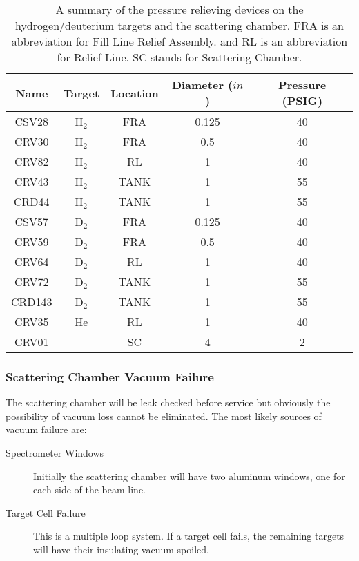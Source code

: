 {\begin{table}[htb]
\begin{center}
\begin{tabular}{|c|c|c|c|c|} \hline
Name & Target & Location & Diameter ($in$) & Pressure (PSIG) \\ \hline
CSV28 & H$_2$ & FRA & 0.125 & 40 \\ \hline
CRV30 & H$_2$ & FRA & 0.5 & 40 \\ \hline
CRV82 & H$_2$ & RL &  1 & 40 \\ \hline
CRV43 & H$_2$ & TANK & 1 & 55 \\ \hline
CRD44 & H$_2$ & TANK & 1 & 55 \\ \hline
CSV57 & D$_2$ & FRA & 0.125 & 40 \\ \hline
CRV59 & D$_2$ & FRA & 0.5 & 40 \\ \hline
CRV64 & D$_2$ & RL &  1 & 40 \\ \hline
CRV72 & D$_2$ & TANK & 1 & 55 \\ \hline
CRD143 & D$_2$ & TANK & 1 & 55 \\ \hline
CRV35 & He & RL &  1 & 40 \\ \hline
CRV01 &  & SC & 4 & 2 \\ \hline
\end{tabular}
\end{center}
\caption[Cryotarget: Relief Device Summary]{ A summary of the pressure relieving devices on the
hydrogen/deuterium targets and the scattering chamber. FRA
is an abbreviation for Fill Line Relief Assembly. 
and RL is an abbreviation for
Relief Line. SC stands for Scattering Chamber.}
\label{ta:pre}
\end{table}

\subsubsection{ Scattering Chamber Vacuum Failure}

The scattering chamber will be leak checked before service but obviously
the possibility of vacuum loss cannot be eliminated. The most
likely sources of vacuum failure are:

\begin{description}
\item[Spectrometer Windows] Initially the scattering chamber will have two
 aluminum windows, one for each side of the beam line.
\item[Target Cell Failure] This is a multiple loop system. If a target
cell fails, the remaining targets will have their insulating
vacuum spoiled.
\end{description}

}
